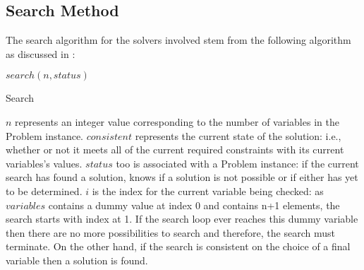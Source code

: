 \documentclass{article}
\begin{document}
\subsection*{Search Method}
The search algorithm for the solvers involved stem from the following algorithm as discussed in \cite{Prosser93}:
\begin{algorithm}
\DontPrintSemicolon
\nl $search(n,status)$ \;
\nl {}
\caption{Search}
\label{bcSearch}
\end{algorithm}
$n$ represents an integer value corresponding to the number of variables in the Problem instance. $consistent$ represents the current state of the solution: i.e., whether or not it meets all of the current required constraints with its current variables's values. $status$ too is associated with a Problem instance: if the current search has found a solution, knows if a solution is not possible or if either has yet to be determined. $i$ is the index for the current variable being checked: as $variables$ contains a dummy value at index 0 and contains n+1 elements, the search starts with index at 1. If the search loop ever reaches this dummy variable then there are no more possibilities to search and therefore, the search must terminate. On the other hand, if the search is consistent on the choice of a final variable then a solution is found.
\end{document}
